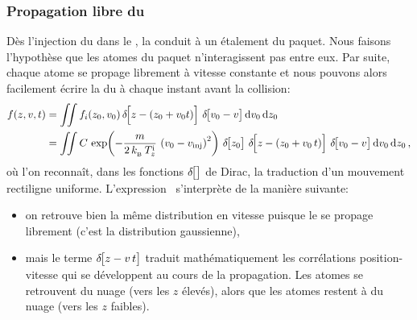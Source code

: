\subsubsection{Propagation libre du \pat}
Dès l'injection du \pat dans le \gm, la \dispvitlong conduit à un étalement du paquet. Nous faisons l'hypothèse que les atomes du paquet n'interagissent pas entre eux. Par suite, chaque atome se propage librement à vitesse constante et nous pouvons alors facilement écrire la \fdd du \pat à chaque instant avant la collision:
\begin{align}
	f(z,v,t) 
	&= 
\iint {{
	f_i(z_0,\vini)\,\Dirac{z - (z_0 + \vini t)}\,\Dirac{\vini - v}
	}{\ddint \vini}}{\ddint z_0} \nonumber \\
	&=
\iint {{
	C\,\Expo{-\frac{m}{2\,\kb\,\Tlongini} \,
	\left( \vini - \vinj \right)^2}\,\Dirac{z_0}\,\Dirac{z - (z_0 + \vini\,t)}\,\Dirac{\vini - v}
	}{\ddint \vini}}{\ddint z_0}
	\virguleformule
\end{align}
où l'on reconnaît, dans les fonctions $\Dirac{}$ de Dirac, la traduction d'un mouvement rectiligne uniforme.
%
L'expression~ s'interprète de la manière suivante: 
\begin{itemize}
	\item on retrouve bien la même distribution en vitesse puisque le \pat se propage librement (c'est la distribution gaussienne),
	\item mais le terme $\Dirac{z - v\,t}$ traduit mathématiquement les corrélations position-vitesse qui se développent au cours de la propagation. Les atomes  se retrouvent  du nuage (\cad vers les $z$ élevés), alors que les atomes  restent à  du nuage (vers les $z$ faibles).
\end{itemize}




